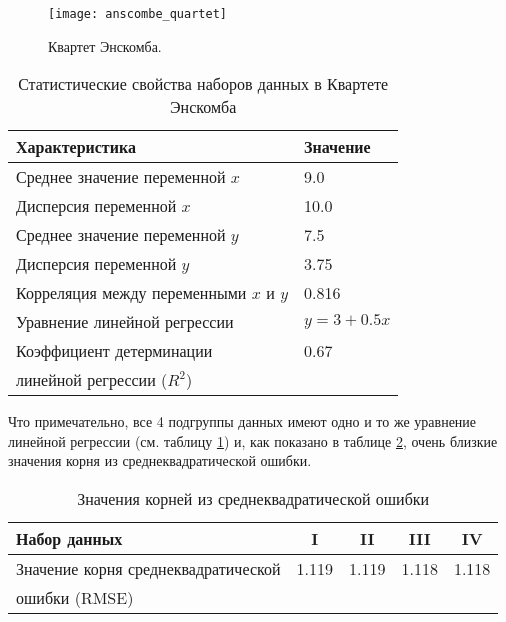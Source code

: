     \begin{figure}[!htp]
        \centering
        \texttt{[image: anscombe\_quartet]}
        \caption{Квартет Энскомба.}
        \label{pic:anscombe_quartet}
    \end{figure}

    \begin{table}[!htp]
    	\centering
    	\caption{Статистические свойства наборов данных в Квартете Энскомба}
		\begin{tabular}{|l|l|}
			\hline
			Характеристика                         & Значение   \\ \hline
			Среднее значение переменной $x$        & 9.0        \\ \hline
			Дисперсия переменной $x$               & 10.0       \\ \hline
			Среднее значение переменной $y$        & 7.5        \\ \hline
			Дисперсия переменной $y$               & 3.75       \\ \hline
			Корреляция между переменными $x$ и $y$ & 0.816      \\ \hline
			Уравнение линейной регрессии           & $y=3+0.5x$ \\ \hline
			Коэффициент детерминации               & 0.67       \\
			линейной регрессии ($R^2$)             &            \\ \hline
		\end{tabular}
		\label{table:anscombe_quartet_statistics}
	\end{table}

	Что примечательно, все 4 подгруппы данных имеют одно и то же уравнение 
	линейной регрессии (см. таблицу \ref{table:anscombe_quartet_statistics}) и, 
	как показано в таблице \ref{table:anscombe_quartet_rmse}, очень близкие 
	значения корня из среднеквадратической ошибки.

	\begin{table}[!htp]
    	\centering
    	\caption{Значения корней из среднеквадратической ошибки}
		\begin{tabular}{|l|c|c|c|c|}
			\hline
			Набор данных                        & I     & II    & III   & IV    \\ \hline
			Значение корня среднеквадратической & 1.119 & 1.119 & 1.118 & 1.118 \\ 
			ошибки (RMSE)                       &       &       &       &       \\ \hline
		\end{tabular}
		\label{table:anscombe_quartet_rmse}
	\end{table}

